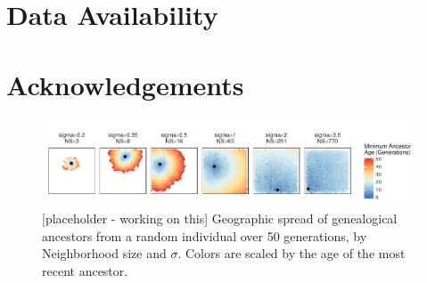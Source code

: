 \documentclass[9pt,twocolumn,twoside,lineno]{gsajnl}
\begin{document}

\section{Data Availability}

\section{Acknowledgements}

\begin{figure}[p]
\centering
\includegraphics[width=\textwidth]{min_ancestor_age_maps.pdf}
\caption{[placeholder - working on this] Geographic spread of genealogical ancestors from a random individual over 50 generations, by Neighborhood size and $\sigma$. Colors are scaled by the age of the most recent ancestor.}
\label{fig:spectrum}
\end{figure}
\end{document}
